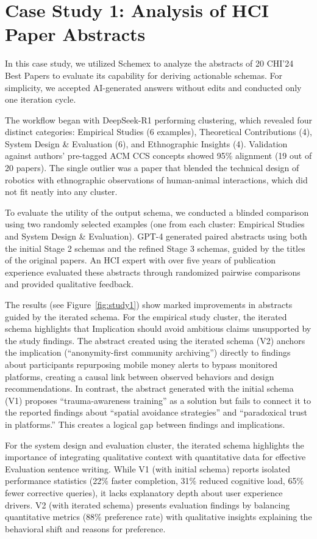 \section{Case Study 1: Analysis of HCI Paper Abstracts}

In this case study, we utilized Schemex to analyze the abstracts of 20 CHI'24 Best Papers to evaluate its capability for deriving actionable schemas. 
For simplicity, we accepted AI-generated answers without edits and conducted only one iteration cycle.

The workflow began with DeepSeek-R1 performing clustering, which revealed four distinct categories: Empirical Studies (6 examples), Theoretical Contributions (4), System Design \& Evaluation (6), and Ethnographic Insights (4). 
Validation against authors' pre-tagged ACM CCS concepts showed 95\% alignment (19 out of 20 papers). 
The single outlier was a paper that blended the technical design of robotics with ethnographic observations of human-animal interactions, which did not fit neatly into any cluster.

To evaluate the utility of the output schema, we conducted a blinded comparison using two randomly selected examples (one from each cluster: Empirical Studies and System Design \& Evaluation). 
GPT-4 generated paired abstracts using both the initial Stage 2 schemas and the refined Stage 3 schemas, guided by the titles of the original papers. 
An HCI expert with over five years of publication experience evaluated these abstracts through randomized pairwise comparisons and provided qualitative feedback.

The results (see Figure~\ref{fig:study1}) show marked improvements in abstracts guided by the iterated schema.
For the empirical study cluster, the iterated schema highlights that Implication should avoid ambitious claims unsupported by the study findings.
The abstract created using the iterated schema (V2) anchors the implication (``anonymity-first community archiving'') directly to findings about participants repurposing mobile money alerts to bypass monitored platforms, creating a causal link between observed behaviors and design recommendations.
In contrast, the abstract generated with the initial schema (V1) proposes ``trauma-awareness training'' as a solution but fails to connect it to the reported findings about ``spatial avoidance strategies'' and ``paradoxical trust in platforms.'' 
This creates a logical gap between findings and implications.

For the system design and evaluation cluster, the iterated schema highlights the importance of integrating qualitative context with quantitative data for effective Evaluation sentence writing.
While V1 (with initial schema) reports isolated performance statistics (22\% faster completion, 31\% reduced cognitive load, 65\% fewer corrective queries), it lacks explanatory depth about user experience drivers.
V2 (with iterated schema) presents evaluation findings by balancing quantitative metrics (88\% preference rate) with qualitative insights explaining the behavioral shift and reasons for preference.




